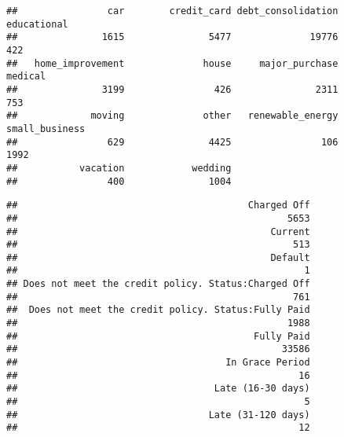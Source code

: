 \documentclass[
]{article}
\newenvironment{Shaded}{\begin{snugshade}}{\end{snugshade}}
\newcommand{\FunctionTok}[1]{\textcolor[rgb]{0.00,0.00,0.00}{#1}}
\newcommand{\NormalTok}[1]{#1}
\newcommand{\SpecialCharTok}[1]{\textcolor[rgb]{0.00,0.00,0.00}{#1}}
\begin{document}
\begin{Shaded}
\end{Shaded}

\begin{verbatim}
##                car        credit_card debt_consolidation        educational 
##               1615               5477              19776                422 
##   home_improvement              house     major_purchase            medical 
##               3199                426               2311                753 
##             moving              other   renewable_energy     small_business 
##                629               4425                106               1992 
##           vacation            wedding 
##                400               1004
\end{verbatim}

\begin{Shaded}
\end{Shaded}

\begin{verbatim}
##                                         Charged Off 
##                                                5653 
##                                             Current 
##                                                 513 
##                                             Default 
##                                                   1 
## Does not meet the credit policy. Status:Charged Off 
##                                                 761 
##  Does not meet the credit policy. Status:Fully Paid 
##                                                1988 
##                                          Fully Paid 
##                                               33586 
##                                     In Grace Period 
##                                                  16 
##                                   Late (16-30 days) 
##                                                   5 
##                                  Late (31-120 days) 
##                                                  12
\end{verbatim}
\end{document}
